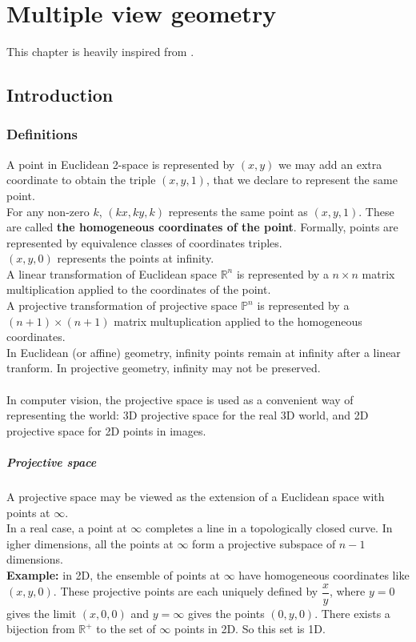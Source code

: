 \documentclass[../main.tex]{subfiles}
\begin{document}
\chapter{Multiple view geometry}
This chapter is heavily inspired from \cite{multi-view-geo}.

\section{Introduction}
\subsection{Definitions}
A point in Euclidean 2-space is represented by $(x, y)$ we may add an extra coordinate to obtain the
triple $(x,y,1)$, that we declare to represent the same point. \\
For any non-zero $k$, $(kx, ky, k)$ represents the same point as $(x,y,1)$. These are called \textbf{the
homogeneous coordinates of the point}. Formally, points are represented by equivalence classes of
coordinates triples.\\
$(x, y, 0)$ represents the points at infinity. \\
A linear transformation of Euclidean space $\mathbb{R}^n$ is represented by a $n \times n$ matrix
multiplication applied to the coordinates of the point. \\
A projective transformation of projective space $\mathbb{P}^n$ is represented by a $(n+1)\times(n+1)$
matrix multuplication applied to the homogeneous coordinates. \\
In Euclidean (or affine) geometry, infinity points remain at infinity after a linear tranform. In projective
geometry, infinity may not be preserved. \\
\\
In computer vision, the projective space is used as a convenient way of representing the world:
3D projective space for the real 3D world, and 2D projective space for 2D points in images. \\

\paragraph{Projective space}
A projective space may be viewed as the extension of a Euclidean space with points at $\infty$. \\
In a real case, a point at $\infty$ completes a line in a topologically closed curve. In igher dimensions,
all the points at $\infty$ form a projective subspace of $n-1$ dimensions. \\
\textbf{Example:} in 2D,  the ensemble of points at $\infty$  have homogeneous coordinates like
$(x, y, 0)$.  These projective points are each uniquely defined by $\dfrac{x}{y}$, where $y=0$ gives the
limit $(x, 0, 0)$ and $y=\infty$ gives the points $(0, y, 0)$. There exists a bijection from $\mathbb{R^+}$ to
the set of $\infty$ points in 2D. So this set is 1D.
\end{document}
